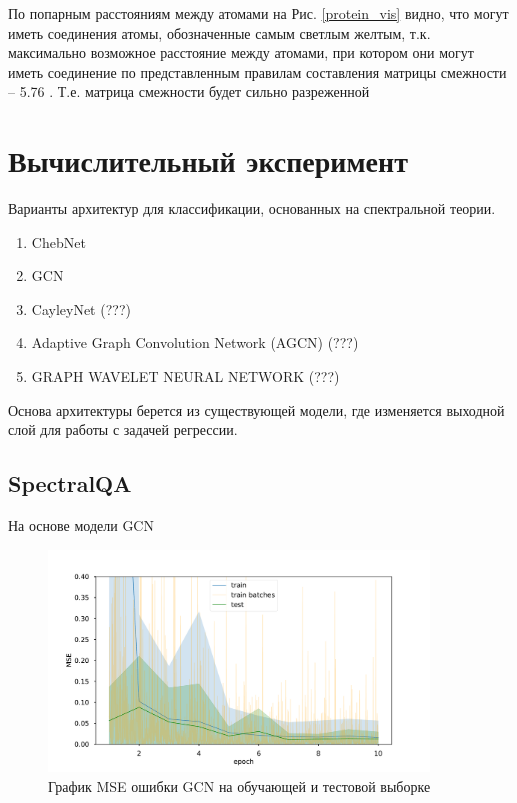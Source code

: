 \documentclass[12pt,twosides]{article}
\begin{document}
	По попарным расстояниям между атомами на Рис. \ref{protein_vis} видно, что могут иметь соединения атомы, обозначенные самым светлым желтым, т.к. максимально возможное расстояние между атомами, при котором они могут иметь соединение по представленным правилам составления матрицы смежности -- 5.76 . Т.е. матрица смежности будет сильно разреженной
	
	\section{Вычислительный эксперимент}
		
	
	Варианты архитектур для классификации, основанных на спектральной теории.
	\begin{enumerate}
		\item ChebNet \cite{NIPS2016_6081}
		\item GCN \cite{kipf_semi-supervised_2017}
		\item CayleyNet (???) 
		\item Adaptive Graph Convolution Network (AGCN) (???) 
		\item GRAPH WAVELET NEURAL NETWORK (???) 
	\end{enumerate}
	
	Основа архитектуры берется из существующей модели, где изменяется выходной слой для работы с задачей регрессии.
	
	\subsection{SpectralQA}
	На основе модели GCN
	\begin{figure}[H]
		\centering
		\includegraphics[width=0.9\textwidth]{training.pdf}
		\caption{График MSE ошибки GCN на обучающей и тестовой выборке}
		\label{GCN}
	\end{figure}
	
\end{document}
